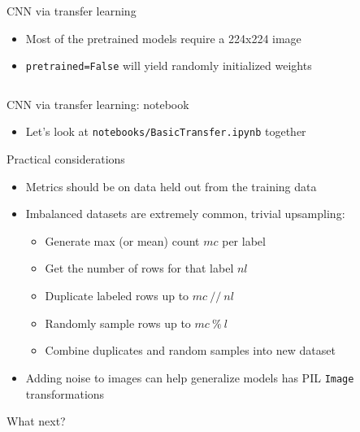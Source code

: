 \documentclass[hyperref={pdfpagelabels=false},12pt]{beamer}
\newcommand{\code}[2]{\texttt{#2}}
\newcommand{\python}[1]{\code{python}{#1}}
\newcommand{\unnamedUrl}[1]{\href{#1}{\color{blue}{#1}}}
\newcommand{\namedUrl}[2]{\href{#1}{\color{blue}{#2}}}
\newcommand{\pygment}[3]{\inputminted[bgcolor=lightgray,linenos,fontsize=#1]{#2}{#3}}
\begin{document}
\begin{frame}{CNN via transfer learning}
  \begin{itemize}
    \item Most of the pretrained models require a 224x224 image
    \item \python{pretrained=False} will yield randomly initialized weights
  \end{itemize}
  \pygment{\scriptsize}{python}{code/transfer-model.py}
\end{frame}

\begin{frame}{CNN via transfer learning: notebook}
  \begin{itemize}
    \item Let's look at \texttt{notebooks/BasicTransfer.ipynb} together
  \end{itemize}
\end{frame}

\begin{frame}{Practical considerations}
  \begin{itemize}
    \item Metrics should be on data held out from the training data
    \item Imbalanced datasets are extremely common, trivial upsampling:
    \begin{itemize}
      \item Generate max (or mean) count $mc$ per label
      \item Get the number of rows for that label $nl$
      \item Duplicate labeled rows up to $mc\ //\ nl$
      \item Randomly sample rows up to $mc\ \%\ l$
      \item Combine duplicates and random samples into new dataset
    \end{itemize}
    \item Adding noise to images can help generalize models
      \namedUrl{https://pytorch.org/docs/stable/torchvision/transforms.html}{Torchvision
      transforms} has PIL \python{Image} transformations
  \end{itemize}
\end{frame}

\begin{frame}{What next?}
  \unnamedUrl{https://forms.gle/YWN8uXhiZLkbvXBM6}
\end{frame}
\end{document}
